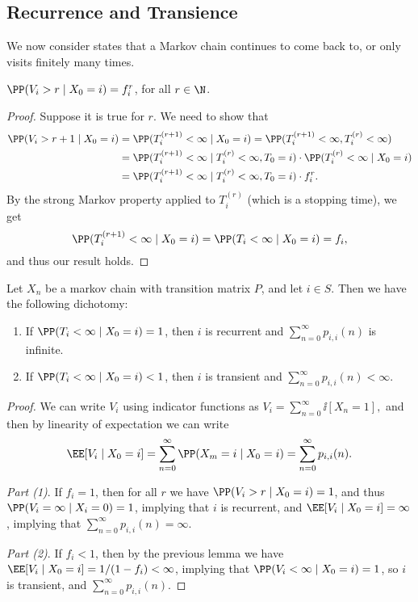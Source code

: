 \documentclass[a4paper]{scrartcl}
\begin{document}
\subsection{Recurrence and Transience}

We now consider states that a Markov chain continues to come back to, or only visits finitely many times.


\begin{lemma}
	$\PP(V_i > r \mid X_0 = i) = f_i^r$, for all $r \in \N$.
\end{lemma}
\begin{proof}
	Suppose it is true for $r$. We need to show that
	\begin{align*}
		\PP(V_i > r + 1 \mid X_0 = i) &= \PP(T_i^{(r + 1)} < \infty \mid X_0 = i) = \PP(T_i^{(r + 1)} < \infty, T_i^{(r)} < \infty) \\
		&= \PP(T_i^{(r + 1)} < \infty \mid T_i^{(r)} < \infty, T_0 = i) \cdot \PP(T_i^{(r)} < \infty \mid X_0 = i) \\
		&= \PP(T_i^{(r + 1)} < \infty \mid T_i^{(r)} < \infty, T_0 = i) \cdot f_i^r. 
	\end{align*}
	By the strong Markov property applied to $T_i^{(r)}$ (which is a stopping time), we get
	$$
	\PP(T_i^{(r + 1)} < \infty \mid X_0 = i) = \PP(T_i < \infty \mid X_0 = i) = f_i,
	$$
	and thus our result holds.
\end{proof}

\begin{theorem}
	Let $X_n$ be a markov chain with transition matrix $P$, and let $i \in S$. Then we have the following dichotomy:
	\begin{enumerate}[label=(\arabic*)]
		\item If $\PP(T_i< \infty \mid X_0 = i) = 1$, then $i$ is recurrent and $\sum_{n = 0}^{\infty} p_{i, i}(n)$ is infinite.
		\item If $\PP(T_i < \infty \mid X_0 = i) < 1$, then $i$ is transient and $\sum_{n = 0}^{\infty} p_{i, i}(n) < \infty$.
	\end{enumerate}
\end{theorem}
\begin{proof}
	We can write $V_i$ using indicator functions as
	$
	V_i = \sum_{n = 0}^{\infty} \ii[X_n = 1],
	$
	and then by linearity of expectation we can write
	$$
	\EE[V_i \mid X_0 = i] = \sum_{n = 0}^{\infty} \PP(X_m = i \mid X_0 = i) = \sum_{n = 0}^{\infty} p_{i, i}(n).
	$$
	
	\emph{Part (1)}. If $f_i = 1$, then for all $r$ we have $\PP(V_i > r \mid X_0 = i) = 1$, and thus $\PP(V_i = \infty \mid X_i = 0) = 1$, implying that $i$ is recurrent, and $\EE[V_i \mid X_0 = i] = \infty$, implying that $\sum_{n = 0}^{\infty} p_{i, i}(n) = \infty$.

	\emph{Part (2)}. If $f_i < 1$, then by the previous lemma we have $\EE[V_i \mid X_0 = i] = 1/(1 - f_i) < \infty$, implying that $\PP(V_i < \infty \mid X_0 = i) = 1$, so $i$ is transient, and $\sum_{n = 0}^{\infty} p_{i, i}(n)$.
\end{proof}
\end{document}
